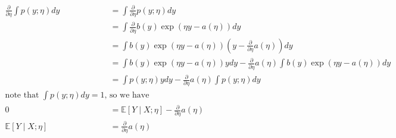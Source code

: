 \begin{answer}
    $$
    \begin{aligned}
        \frac{\partial}{\partial \eta} \int p(y;\eta) dy &= \int \frac{\partial}{\partial \eta} p(y;\eta) dy\\
        &= \int \frac{\partial}{\partial \eta} b(y)\exp(\eta y - a(\eta))dy \\
        &= \int b(y)\exp(\eta y - a(\eta))(y - \frac{\partial}{\partial\eta}a(\eta))dy \\
        &= \int b(y)\exp(\eta y - a(\eta))y dy - \frac{\partial}{\partial\eta}a(\eta) \int b(y)\exp(\eta y - a(\eta))dy \\
        &= \int p(y;\eta)y dy - \frac{\partial}{\partial\eta}a(\eta) \int p(y;\eta)dy \\
        \text{note that $\int p(y;\eta) dy = 1$, so we have}\\
        0 &= \mathbb{E}[Y\mid X; \eta] - \frac{\partial}{\partial\eta}a(\eta) \\
        \mathbb{E}[Y\mid X; \eta] &= \frac{\partial}{\partial\eta}a(\eta)
    \end{aligned}
    $$
 
\end{answer}
